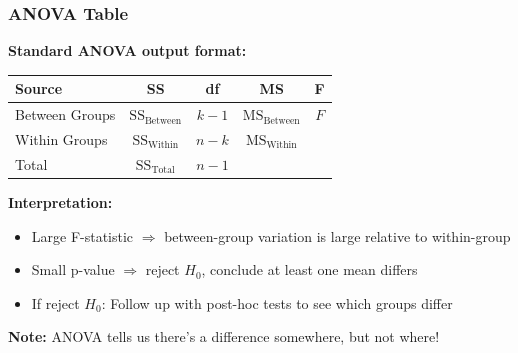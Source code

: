 \documentclass{beamer}
\begin{document}
\begin{frame}
\frametitle{ANOVA Table}
\textbf{Standard ANOVA output format:}

\vspace{0.3cm}
\begin{center}
\begin{tabular}{lcccc}
\toprule
Source & SS & df & MS & F \\
\midrule
Between Groups & $\text{SS}_{\text{Between}}$ & $k-1$ & $\text{MS}_{\text{Between}}$ & $F$ \\
Within Groups & $\text{SS}_{\text{Within}}$ & $n-k$ & $\text{MS}_{\text{Within}}$ & \\
\midrule
Total & $\text{SS}_{\text{Total}}$ & $n-1$ & & \\
\bottomrule
\end{tabular}
\end{center}

\vspace{0.5cm}
\textbf{Interpretation:}
\begin{itemize}
\item Large F-statistic $\Rightarrow$ between-group variation is large relative to within-group
\item Small p-value $\Rightarrow$ reject $H_0$, conclude at least one mean differs
\item If reject $H_0$: Follow up with post-hoc tests to see which groups differ
\end{itemize}

\vspace{0.3cm}
\textbf{Note:} ANOVA tells us there's a difference somewhere, but not where!
\end{frame}
\end{document}
